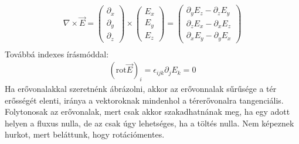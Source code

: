 \documentclass{article}
\begin{document}
\begin{gather*}
\nabla \times \vec{E} = 
\begin{pmatrix}
\partial_x \\ \partial_y \\ \partial_z
\end{pmatrix} \times \begin{pmatrix}
E_x \\ E_y \\ E_z
\end{pmatrix} = \begin{pmatrix}
\partial_y E_z - \partial_z E_y \\ \partial_z E_x - \partial_x E_z \\ \partial_x E_y - \partial_y E_x
\end{pmatrix} \\
\end{gather*}
Továbbá indexes írásmóddal: 
\begin{gather*}
(\mathrm{rot} \vec{E})_i = \epsilon_{ijk} \partial_{j} E_k = 0
\end{gather*}
Ha erővonalakkal szeretnénk ábrázolni, akkor az erővonnalak sűrűsége a tér erősségét elenti, iránya a vektoroknak mindenhol a térerővonalra tangenciális. Folytonosak az erővonalak, mert csak akkor szakadhatnának meg, ha egy adott helyen a fluxus nulla, de az csak úgy lehetséges, ha a töltés nulla. Nem képeznek hurkot, mert beláttunk, hogy rotációmentes.
\end{document}
